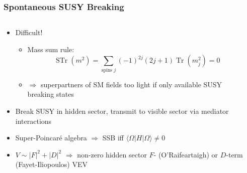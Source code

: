 \documentclass[10pt,aspectratio=169]{beamer}
\newcommand*\widefbox[1]{\fbox{\hspace{0.5em}#1\hspace{0.5em}}}
\DeclareMathOperator{\Tr}{Tr}
\DeclareMathOperator{\STr}{STr}
\begin{document}
\begin{frame}
  \frametitle{Spontaneous SUSY Breaking}
  \begin{columns}[t]
    \begin{column}{0.5\textwidth}
      \begin{itemize}\itemsep1em
      \item \alert{Difficult!}
        \begin{itemize}
        \item Mass sum rule:
          \begin{equation*}
            \STr(m^2) = \sum_{\text{spins } j} (-1)^{2j} (2 j + 1) \Tr(m_j^2)
            = 0
          \end{equation*}
        \item $\Rightarrow$ superpartners of SM fields too light if only
          available SUSY breaking states
        \end{itemize}
      \item Break SUSY in hidden sector, transmit to visible sector via
        mediator interactions
      \item Super-Poincar\'{e} algebra $\Rightarrow$ SSB iff $\langle \Omega
        | H | \Omega \rangle \neq 0$
      \item $V \sim |F|^2 + |D|^2$ $\Rightarrow$ non-zero hidden sector $F$-
        (O'Raifeartaigh) or $D$-term (Fayet-Iliopoulos) VEV
      \end{itemize}
    \end{column}
    \begin{column}{0.5\textwidth}
      \begin{center}
\end{center}
\end{column}
\end{columns}
\end{frame}
\end{document}
